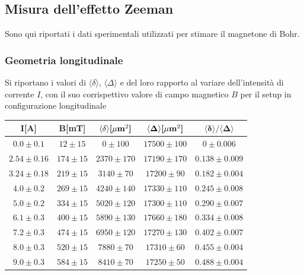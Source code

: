 \subsection{Misura dell'effetto Zeeman}
Sono qui riportati i dati sperimentali utilizzati per stimare il magnetone di Bohr.
\subsubsection{Geometria longitudinale}
\label{sec:longit}
Si riportano i valori di $\langle\delta\rangle$, $\langle\Delta\rangle$ e del loro
rapporto al variare dell'intensità di corrente $I$, con il suo corrispettivo valore
di campo magnetico $B$ per il setup in configurazione longitudinale

\begin{table}[H]
    \centering
    \begin{tabular}{|c|c|c|c|c|} \hline
	\textbf{I[A]} & \textbf{B[mT]} & $\mathbf{\langle\delta\rangle}\text{\textbf{[}}\mathbf{\mu}\text{\textbf{m}}^2\textbf{]}$  & $\mathbf{\langle\Delta\rangle}\text{\textbf{[}}\mathbf{\mu}\text{\textbf{m}}^2\textbf{]}$  & $\mathbf{\langle\delta\rangle/\langle\Delta\rangle}$ \\ \hline\hline
$0.0\pm0.1$ & $12\pm15$ & $0\pm100$ 	& $17500\pm100$ & $0\pm0.006$ \\ \hline
$2.54\pm0.16$ & $174\pm15$ &$2370\pm170$ & $17190\pm170$ &$0.138\pm0.009$ \\ \hline
$3.24\pm0.18$ & $219\pm15$ &$3140\pm70$ 	& $17200\pm90$ &$0.182\pm0.004$ \\ \hline
$4.0\pm0.2$ & $269\pm15$ &$4240\pm140$ 	& $17330\pm110$ &$0.245\pm0.008$ \\ \hline
$5.0\pm0.2$ & $334\pm15$ &$5020\pm120$ 	& $17300\pm110$ &$0.290\pm0.007$ \\ \hline
$6.1\pm0.3$ & $400\pm15$&$5890\pm130$ 	& $17660\pm180$ &$0.334\pm0.008$ \\ \hline
$7.2\pm0.3$ & $474\pm15$ &$6950\pm120$ 	& $17270\pm130$ &$0.402\pm0.007$ \\ \hline
$8.0\pm0.3$ & $520\pm15$ &$7880\pm70$ 	& $17310\pm60$ &$0.455\pm0.004$ \\ \hline
$9.0\pm0.3$ & $584\pm15$ &$8410\pm70$ 	& $17250\pm50$ &$0.488\pm0.004$ \\ \hline
\end{tabular}
\label{tab:longit}
\end{table}

